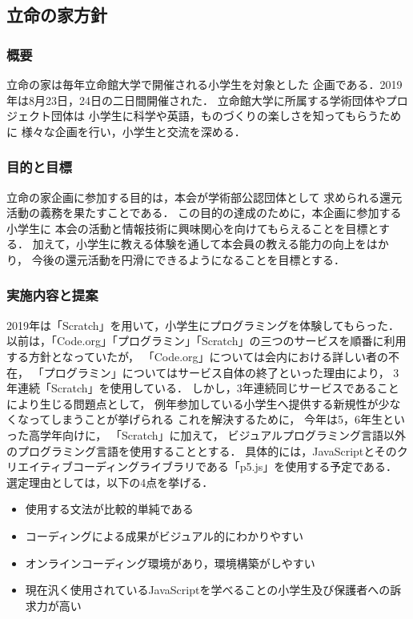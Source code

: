 \subsection*{立命の家方針}


\subsubsection*{概要}
立命の家は毎年立命館大学で開催される小学生を対象とした
企画である．2019年は8月23日，24日の二日間開催された．
立命館大学に所属する学術団体やプロジェクト団体は
小学生に科学や英語，ものづくりの楽しさを知ってもらうために
様々な企画を行い，小学生と交流を深める．

\subsubsection*{目的と目標}
立命の家企画に参加する目的は，本会が学術部公認団体として
求められる還元活動の義務を果たすことである．
この目的の達成のために，本企画に参加する小学生に
本会の活動と情報技術に興味関心を向けてもらえることを目標とする．
加えて，小学生に教える体験を通して本会員の教える能力の向上をはかり，
今後の還元活動を円滑にできるようになることを目標とする．

\subsubsection*{実施内容と提案}
2019年は「Scratch」を用いて，小学生にプログラミングを体験してもらった．
以前は，「Code.org」「プログラミン」「Scratch」の三つのサービスを順番に利用する方針となっていたが，
「Code.org」については会内における詳しい者の不在，
「プログラミン」についてはサービス自体の終了といった理由により，
3年連続「Scratch」を使用している．
しかし，3年連続同じサービスであることにより生じる問題点として，
例年参加している小学生へ提供する新規性が少なくなってしまうことが挙げられる
これを解決するために，
今年は5，6年生といった高学年向けに，
「Scratch」に加えて，
ビジュアルプログラミング言語以外のプログラミング言語を使用することとする．
具体的には，JavaScriptとそのクリエイティブコーディングライブラリである「p5.js」を使用する予定である．
選定理由としては，以下の4点を挙げる．

\begin {itemize}
    \item 使用する文法が比較的単純である
    \item コーディングによる成果がビジュアル的にわかりやすい
    \item オンラインコーディング環境があり，環境構築がしやすい
    \item 現在汎く使用されているJavaScriptを学べることの小学生及び保護者への訴求力が高い
\end {itemize}

